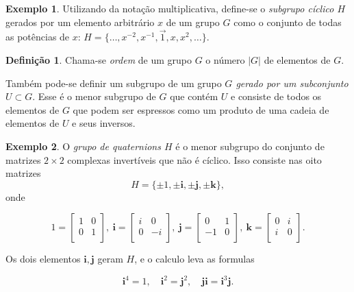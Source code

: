 \documentclass[a4paper,12pt]{report}
\theoremstyle{plain}
\theoremstyle{definition}
\newtheorem{definicao}{Definição}[section]
\newtheorem{exemplo}{Exemplo}[section]
\begin{document}
	\begin{exemplo}
		Utilizando da notação multiplicativa, define-se o
		\emph{subgrupo cíclico \(H\)} gerados por um elemento arbitrário \(x\)
		de um grupo \(G\) como o conjunto de todas as potências de \(x\):
		\(H = \{\dots , x^{-2}, x^{-1},\vec{1},x,x^2,\dots\}\).
	\end{exemplo}
	
	\begin{definicao}
		Chama-se \emph{ordem} de um grupo \(G\) o número \(|G|\) de elementos de \(G\).
	\end{definicao}
	
	Também pode-se definir um subgrupo de um grupo \emph{\(G\) gerado por um
	subconjunto \(U \subset G\)}. Esse é o menor subgrupo de \(G\) que
	contém \(U\) e consiste de todos os elementos de \(G\) que podem ser
	espressos como um produto de uma cadeia de elementos de \(U\) e seus
	inversos.
	
	\begin{exemplo}
		O \emph{grupo de quaternions \(H\)} é o menor subgrupo
		do conjunto de matrizes \(2\times 2\) complexas invertíveis que não é
		cíclico. Isso consiste nas oito matrizes
		\[H = \{\pm 1, \pm \mathbf{i}, \pm \mathbf{j}, \pm \mathbf{k}\},\] onde
		
		\[
		1=
		\begin{bmatrix}
			1 & 0 \\
			0 & 1 \\
		\end{bmatrix},
		\ \mathbf{i}=
		\begin{bmatrix}
			i & 0 \\
			0 & -i \\
		\end{bmatrix},
		\ \mathbf{j}=
		\begin{bmatrix}
			0 & 1 \\
			-1 & 0 \\
		\end{bmatrix},
		\ \mathbf{k}=
		\begin{bmatrix}
			0 & i \\
			i & 0 \\
		\end{bmatrix}.
		\]
		
		Os dois elementos \(\mathbf{i}, \mathbf{j}\) geram \(H\), e o calculo
		leva as formulas
		
		\[\mathbf{i}^4 = 1, \quad \mathbf{i}^2 = \mathbf{j}^2, \quad \mathbf{j}\mathbf{i} = \mathbf{i}^3\mathbf{j}.\]
	\end{exemplo}
	
\end{document}
